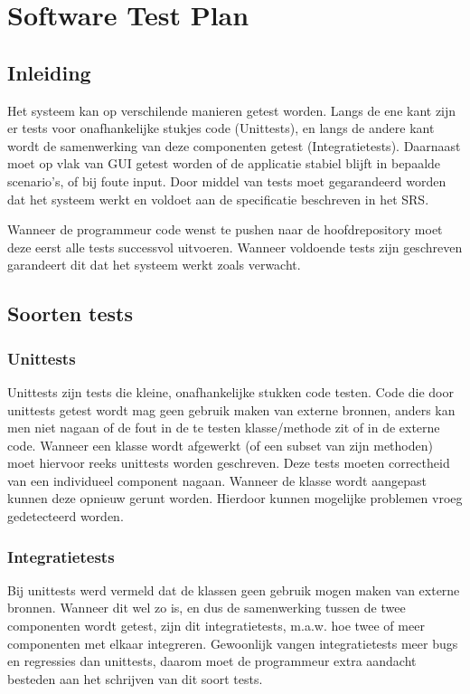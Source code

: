 \chapter{Software Test Plan}
\section{Inleiding}
Het systeem kan op verschilende manieren getest worden. 
Langs de ene kant zijn er tests voor onafhankelijke stukjes code (Unittests), en langs de andere kant wordt de samenwerking van deze componenten getest (Integratietests). 
Daarnaast moet op vlak van GUI getest worden of de applicatie stabiel blijft in bepaalde scenario's, of bij foute input. 
Door middel van tests moet gegarandeerd worden dat het systeem werkt en voldoet aan de specificatie beschreven in het SRS\cite{srs}. 

Wanneer de programmeur code wenst te pushen naar de hoofdrepository moet deze eerst alle tests successvol uitvoeren. 
Wanneer voldoende tests zijn geschreven garandeert dit dat het systeem werkt zoals verwacht.

\section{Soorten tests}

\subsection{Unittests}
Unittests zijn tests die kleine, onafhankelijke stukken code testen. Code die door unittests getest wordt mag geen gebruik maken van externe bronnen, anders kan men niet nagaan of de fout in de te testen klasse/methode zit of in de externe code.
Wanneer een klasse wordt afgewerkt (of een subset van zijn methoden) moet hiervoor reeks unittests worden geschreven. 
Deze tests moeten correctheid van een individueel component nagaan. 
Wanneer de klasse wordt aangepast kunnen deze opnieuw gerunt worden. Hierdoor kunnen mogelijke problemen vroeg gedetecteerd worden.

\subsection{Integratietests}
Bij unittests werd vermeld dat de klassen geen gebruik mogen maken van externe bronnen. Wanneer dit wel zo is, en dus de samenwerking tussen de twee componenten wordt getest, zijn dit integratietests, m.a.w. hoe twee of meer componenten met elkaar integreren. 
Gewoonlijk vangen integratietests meer bugs en regressies dan unittests, daarom moet de programmeur extra aandacht besteden aan het schrijven van dit soort tests.

